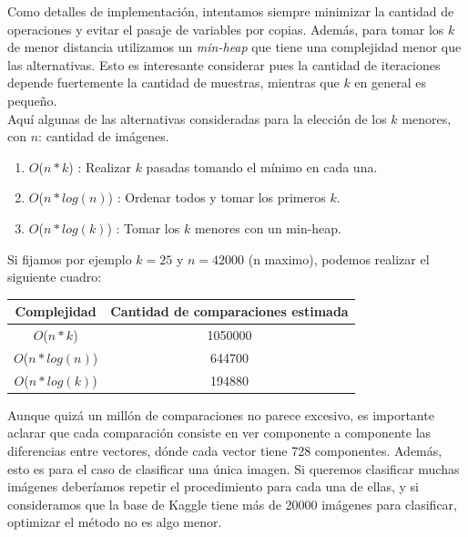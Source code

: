 Como detalles de implementación, intentamos siempre minimizar la cantidad de operaciones y evitar el pasaje de variables por copias. Además, para tomar los $k$ de menor distancia utilizamos un \textit{min-heap} que tiene una complejidad menor que las alternativas. Esto es interesante considerar pues la cantidad de iteraciones depende fuertemente la cantidad de muestras, mientras que $k$ en general es pequeño.\\

Aquí algunas de las alternativas consideradas para la elección de los $k$ menores, con $n$: cantidad de imágenes.

\begin{enumerate}
\item $O$($n * k$) : Realizar $k$ pasadas tomando el mínimo en cada una.
\item $O$($n * log(n)$) : Ordenar todos y tomar los primeros $k$.
\item $O$($n * log(k)$) : Tomar los $k$ menores con un min-heap.
\end{enumerate}

Si fijamos por ejemplo $k = 25$ y $n = 42000$ (n maximo), podemos realizar el siguiente cuadro:

\begin{center}
    \begin{tabular}{| c | c |}
    \hline
    Complejidad   &  Cantidad de comparaciones estimada \\ \hline

    $O$($n * k$)            & 1050000  \\ \hline
    $O$($n * log(n)$)       & 644700  \\ \hline
    $O$($n * log(k)$)       & 194880   \\ \hline
    \end{tabular}
\end{center}

Aunque quizá un millón de comparaciones no parece excesivo, es importante aclarar que cada comparación consiste en ver componente a componente las diferencias entre vectores, dónde cada vector tiene 728 componentes. Además, esto es para el caso de clasificar una única imagen. Si queremos clasificar muchas imágenes deberíamos repetir el procedimiento para cada una de ellas, y si consideramos que la base de Kaggle tiene más de 20000 imágenes para clasificar, optimizar el método no es algo menor. \\


